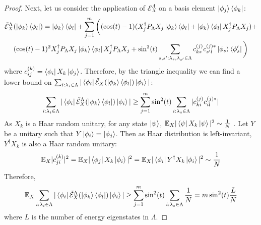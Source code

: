 \documentclass[10pt]{amsart}
\newcommand{\E}{\mathcal{E}}
\begin{document}
\begin{proof}
    Next, let us consider the application of $\E_X^{\Lambda}$ on a basis element $\ket{\phi_j}\bra{\phi_k}$:
    \begin{multline}
    \label{eq_application_of_E_to_state}
        \tilde{\mathcal{E}}^{\Lambda}_{X}(\ket{\phi_k}\bra{\phi_l}) = \ket{\phi_k}\bra{\phi_l} + \sum_{j=1}^m \bigg( (\cos (t) -1) \huge(X_j^{\dagger}P_{\Lambda} X_j \ket{\phi_k}\bra{\phi_l} +  \ket{\phi_k}\bra{\phi_l} X_j^{\dagger}P_{\Lambda} X_j\huge) + \\ (\cos (t) -1)^2 X_j^{\dagger}P_{\Lambda} X_j \ket{\phi_k}\bra{\phi_l} X_j^{\dagger}P_{\Lambda} X_j + \sin^2(t) \sum_{s, s': \lambda_s, \lambda_{s'} \in \Lambda}c_{ks}^{(j)}c^{(j)*}_{s'l}\ket{\phi_s}\bra{\phi_s'}\bigg)
    \end{multline}
    where $c_{ij}^{(k)} =  \bra{\phi_i}X_k\ket{\phi_j}$. Therefore, by the triangle inequality we can find a lower bound on $\sum_{i: \lambda_i \in \Lambda} |\bra{\phi_i} \tilde{\mathcal{E}}_{X}(\ket{\phi_k}\bra{\phi_l}) \ket{\phi_i}|$:
    \begin{equation}
    \label{eq_lower_bound_on_P0E}
        \sum_{i: \lambda_i \in \Lambda} |\bra{\phi_i} \tilde{\mathcal{E}}^{\Lambda}_{X}(\ket{\phi_k}\bra{\phi_l}) \ket{\phi_i}| \geq \sum_{j=1}^m\sin^2(t) \sum_{i: \lambda_s \in \Lambda}|c_{ki}^{(j)}c_{il}^{(j)*}|
    \end{equation}
    As $X_k$ is a Haar random unitary, for any state $\ket{\psi}$,  $\mathbb{E}_X |\bra{\psi}X_k\ket{\psi}|^2 \sim \frac{1}{N}$ \cite{}.
    Let $Y$ be a unitary such that $Y\ket{\phi_i} = \ket{\phi_j}$. Then as Haar distribution is left-invariant, $Y^{\dagger} X_k$ is also a Haar random unitary:
    \begin{equation}
\mathbb{E}_X |c_{ji}^{(k)}|^2 = \mathbb{E}_X |\bra{\phi_j}X_k\ket{\phi_i}|^2= \mathbb{E}_X |\bra{\phi_i}Y^{\dagger}X_k\ket{\phi_i}|^2 \sim \frac{1}{N}
    \end{equation}
    Therefore,
    \begin{equation}
        \mathbb{E}_X \sum_{i: \lambda_i \in \Lambda} |\bra{\phi_i} \tilde{\mathcal{E}}^{\Lambda}_{X}(\ket{\phi_k}\bra{\phi_l}) \ket{\phi_i}| \geq \sum_{j=1}^m\sin^2(t) \sum_{i: \lambda_s \in \Lambda}\frac{1}{N} = m\sin^2(t)\frac{ L}{N}
    \end{equation}
    where $L$ is the number of energy eigenstates in $\Lambda$. 


\end{proof}
\end{document}
